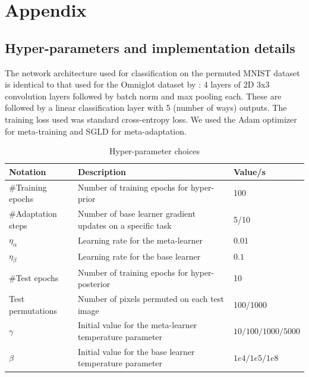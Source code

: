 \documentclass{article}
\theoremstyle{definition}
\begin{document}
\clearpage



\clearpage
\appendix
\section{Appendix}

\subsection{Hyper-parameters and implementation details} \label{append:hyper-params}

The network architecture used for classification on the permuted MNIST dataset is identical to that used for the Omniglot dataset by \citet{Vinyals2016}: 4 layers of 2D 3x3 convolution layers followed by batch norm and max pooling each. These are followed by a linear classification layer with 5 (number of ways) outputs. The training loss used was standard cross-entropy loss. We used the Adam optimizer for meta-training and SGLD for meta-adaptation.

\begin{table}[h]	
	
	\centering
	\begin{tabular}{lll}
		\toprule
		Notation   & Description  & Value/s   \\
		\midrule
		\#Training epochs & Number of training epochs for hyper-prior   & 100      \\
		\midrule
		\#Adaptation steps & Number of base learner gradient updates on a specific task   & 5/10      \\
		\midrule
		$\eta_{\alpha}$  & Learning rate for the meta-learner   & $0.01$      \\
		\midrule
		$\eta_{\beta}$  & Learning rate for the base learner   & $0.1$      \\
		\midrule
		\#Test epochs  & Number of training epochs for hyper-posterior   & 10      \\
		\midrule
		Test permutations  & Number of pixels permuted on each test image   & 100/1000      \\
		\midrule
		$\gamma$  & Initial value for the meta-learner temperature parameter   & $10/100/1000/5000$      \\
		\midrule
		$\beta$  & Initial value for the base learner temperature parameter   & $1e4/1e5/1e8$      \\
		\bottomrule
	\end{tabular}
	\caption{Hyper-parameter choices}
	\label{table:hyper-params}
\end{table}
\end{document}
